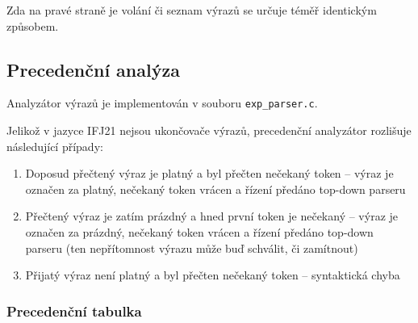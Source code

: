 \documentclass[a4paper]{article}
\theoremstyle{definition}
\begin{document}
Zda na pravé straně je volání či seznam výrazů se určuje téměř identickým způsobem.

\subsection{Precedenční analýza}

Analyzátor výrazů je implementován v souboru \texttt{exp\_parser.c}.

Jelikož v jazyce IFJ21 nejsou ukončovače výrazů, precedenční analyzátor rozlišuje následující případy:

\begin{enumerate}
	\item Doposud přečtený výraz je platný a byl přečten nečekaný token -- výraz je označen za platný, nečekaný token vrácen a řízení předáno top-down parseru

	\item Přečtený výraz je zatím prázdný a hned první token je nečekaný -- výraz je označen za prázdný, nečekaný token vrácen a řízení předáno top-down parseru (ten nepřítomnost výrazu může buď schválit, či zamítnout)
	
	\item Přijatý výraz není platný a byl přečten nečekaný token -- syntaktická chyba
\end{enumerate}

\subsubsection{Precedenční tabulka}
\end{document}
